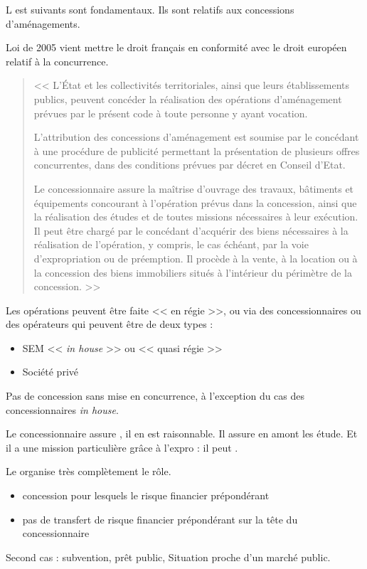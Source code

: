 	L est suivants sont fondamentaux. Ils sont relatifs aux concessions d'aménagements.

	Loi de 2005 vient mettre le droit français en conformité avec le droit européen relatif à la concurrence.

	\begin{quote}
		\textbf{}

		<< {\itshape } L'État et les collectivités territoriales, ainsi que leurs établissements publics, peuvent concéder la réalisation des opérations d'aménagement prévues par le présent code à toute personne y ayant vocation.

		\medskip L'attribution des concessions d'aménagement est soumise par le concédant à une procédure de publicité permettant la présentation de plusieurs offres concurrentes, dans des conditions prévues par décret en Conseil d'Etat. \lips

		\medskip Le concessionnaire assure la maîtrise d'ouvrage des travaux, bâtiments et équipements concourant à l'opération prévus dans la concession, ainsi que la réalisation des études et de toutes missions nécessaires à leur exécution. Il peut être chargé par le concédant d'acquérir des biens nécessaires à la réalisation de l'opération, y compris, le cas échéant, par la voie d'expropriation ou de préemption. Il procède à la vente, à la location ou à la concession des biens immobiliers situés à l'intérieur du périmètre de la concession.  >>
	\end{quote}

	Les opérations peuvent être faite << en régie >>, ou via des concessionnaires ou des opérateurs qui peuvent être de deux types :
	\begin{itemize}
		\item SEM << \emph{in house} >> ou << quasi régie >>
		\item Société privé
	\end{itemize}
	Pas de concession sans mise en concurrence, à l'exception du cas des concessionnaires \emph{in house}.

	Le concessionnaire assure , il en est raisonnable. Il assure en amont les étude. Et il a une mission particulière grâce à l'expro : il peut .

	Le \CU organise très complètement le rôle.

	\begin{itemize}
		\item {} concession pour lesquels le risque financier prépondérant
		\item {} pas de transfert de risque financier prépondérant sur la tête du concessionnaire
	\end{itemize}
	Second cas : subvention, prêt public, \etc Situation proche d'un marché public.

